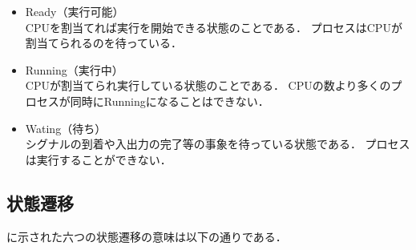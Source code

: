 \begin{itemize}
\item Ready（実行可能） \\
CPUを割当てれば実行を開始できる状態のことである．
プロセスはCPUが割当てられるのを待っている．
\item Running（実行中） \\
CPUが割当てられ実行している状態のことである．
CPUの数より多くのプロセスが同時にRunningになることはできない．
\item Wating（待ち） \\
シグナルの到着や入出力の完了等の事象を待っている状態である．
プロセスは実行することができない．
\end{itemize}


\subsection{状態遷移}
に示された六つの状態遷移の意味は以下の通りである．

